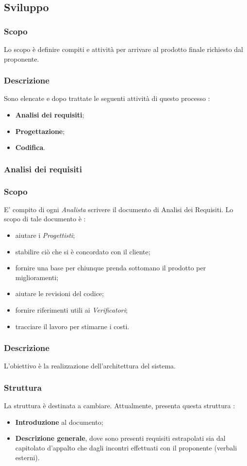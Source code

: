 \subsection{Sviluppo}
\subsubsection{Scopo}
Lo scopo è definire compiti e attività per arrivare al prodotto finale richiesto dal proponente.
\subsubsection{Descrizione}
Sono elencate e dopo trattate le seguenti attività di questo processo :
\begin{itemize}
  \item \textbf{Analisi dei requisiti};
  \item \textbf{Progettazione};
  \item \textbf{Codifica}.
\end{itemize}
\subsubsection{Analisi dei requisiti}
\subsubsection{Scopo}
E’ compito di ogni \textit{Analista} scrivere il documento di Analisi dei Requisiti. Lo scopo di tale documento è :
\begin{itemize}
  \item aiutare i \textit{Progettisti};
  \item stabilire ciò che si è concordato con il cliente;
  \item fornire una base per chiunque prenda sottomano il prodotto per miglioramenti;
  \item aiutare le revisioni del codice;
  \item fornire riferimenti utili ai \textit{Verificatori};
  \item tracciare il lavoro per stimarne i costi.
\end{itemize}

\subsubsection{Descrizione}
L’obiettivo è la realizzazione dell’architettura del sistema.

\subsubsection{Struttura}
La struttura è destinata a cambiare.
Attualmente, \AdR presenta questa struttura :
\begin{itemize}
  \item \textbf{Introduzione} al documento;
  \item \textbf{Descrizione generale}, dove sono presenti requisiti estrapolati sia dal capitolato d’appalto che dagli incontri effettuati con il proponente (verbali esterni).
\end{itemize}


